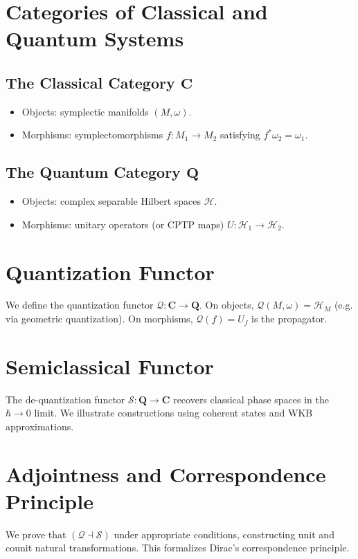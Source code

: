\documentclass[11pt]{article}
\begin{document}
\section{Categories of Classical and Quantum Systems}
\subsection{The Classical Category $\mathbf{C}$}
\begin{itemize}
  \item Objects: symplectic manifolds $(M,\omega)$.
  \item Morphisms: symplectomorphisms $f: M_1 \to M_2$ satisfying $f^*\omega_2=\omega_1$.
\end{itemize}

\subsection{The Quantum Category $\mathbf{Q}$}
\begin{itemize}
  \item Objects: complex separable Hilbert spaces $\mathcal H$.
  \item Morphisms: unitary operators (or CPTP maps) $U: \mathcal H_1 \to \mathcal H_2$.
\end{itemize}

\section{Quantization Functor}
We define the quantization functor $\mathcal Q: \mathbf{C} \to \mathbf{Q}$.  On objects, $\mathcal Q(M,\omega)=\mathcal H_M$ (e.g. via geometric quantization).  On morphisms, $\mathcal Q(f)=U_f$ is the propagator.

\section{Semiclassical Functor}
The de-quantization functor $\mathcal S: \mathbf{Q} \to \mathbf{C}$ recovers classical phase spaces in the $\hbar \to 0$ limit.  We illustrate constructions using coherent states and WKB approximations.

\section{Adjointness and Correspondence Principle}
We prove that $(\mathcal Q \dashv \mathcal S)$ under appropriate conditions, constructing unit and counit natural transformations.  This formalizes Dirac's correspondence principle.
\end{document}
